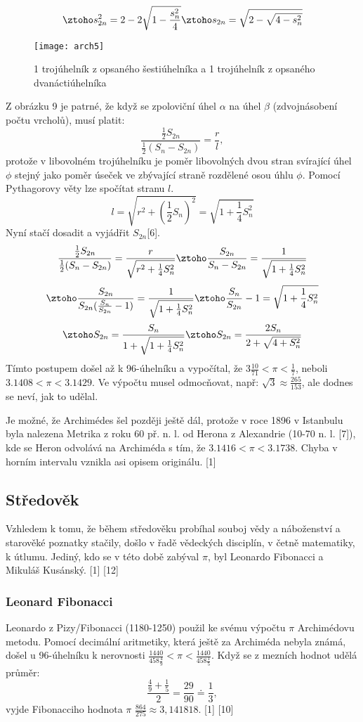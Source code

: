 \documentclass[soc]{gzwroc} %
\begin{document}
\begin{equation}
\ztoho s_{2n}^2=2-2\sqrt{1-\frac{s_n^2}{4}} \ztoho s_{2n}=\sqrt{2-\sqrt{4-s_n^2}}
\end{equation}
\begin{figure}[!ht]
\texttt{[image: arch5]}
\caption{1 trojúhelník z opsaného šestiúhelníka a 1 trojúhelník z opsaného dvanáctiúhelníka}
\label{fig:kruh}
\end{figure}
Z obrázku 9 je patrné, že když se zpoloviční úhel $\alpha$ na úhel $\beta$ (zdvojnásobení počtu vrcholů), musí platit:
$$
\frac{\frac{1}{2}S_{2n}}{\frac{1}{2}(S_n-S_{2n})}=\frac{r}{l},
$$
protože v libovolném trojúhelníku je poměr libovolných dvou stran svírající úhel $\phi$ stejný jako poměr úseček ve zbývající straně rozdělené osou úhlu $\phi$. Pomocí Pythagorovy věty lze spočítat stranu $l$.
$$
l=\sqrt{r^2+\left(\frac{1}{2}S_n\right)^2}=\sqrt{1+\frac{1}{4}S_n^2}
$$
Nyní stačí dosadit a vyjádřit $S_{2n}$[6].
$$
\frac{\frac{1}{2}S_{2n}}{\frac{1}{2}(S_n-S_{2n})}=\frac{r}{\sqrt{r^2+\frac{1}{4}S^2_n}} \ztoho \frac{S_{2n}}{S_n-S_{2n}}=\frac{1}{\sqrt{1+\frac{1}{4}S^2_n}}
$$
$$
\ztoho \frac{S_{2n}}{S_{2n}(\frac{S_n}{S_{2n}}-1)}=\frac{1}{\sqrt{1+\frac{1}{4}S^2_n}} \ztoho \frac{S_n}{S_{2n}}-1=\sqrt{1+\frac{1}{4}S^2_n}
$$
\begin{equation}
\ztoho S_{2n}=\frac{S_n}{1+\sqrt{1+\frac{1}{4}S^2_n}} \ztoho S_{2n}=\frac{2S_n}{2+\sqrt{4+S^2_n}} 
\end{equation}
Tímto postupem došel až k 96-úhelníku a vypočítal, že $3\frac{10}{71}<\pi <\frac{1}{7}$, neboli $3.1408<\pi <3.1429$. Ve výpočtu musel odmocňovat, např: $\sqrt{3}\approx \frac{265}{153}$, ale dodnes se neví, jak to udělal.

Je možné, že Archimédes šel později ještě dál, protože v roce 1896 v Istanbulu byla nalezena Metrika z roku 60 př. n. l. od Herona z Alexandrie (10-70 n. l. [7]), kde se Heron odvolává na Archiméda s tím, že $3.1416<\pi <3.1738$. Chyba v horním intervalu vznikla asi opisem originálu. [1]
\subsection{Středověk}
Vzhledem k tomu, že během středověku probíhal souboj vědy a náboženství a starověké poznatky stačily, došlo v řadě vědeckých disciplín, v četně matematiky, k útlumu. Jediný, kdo se v této době zabýval $\pi$, byl Leonardo Fibonacci a Mikuláš Kusánský. [1] [12]
\subsubsection{Leonard Fibonacci}
Leonardo z Pizy/Fibonacci (1180-1250) použil ke svému výpočtu $\pi$ Archimédovu metodu. Pomocí decimální aritmetiky, která ještě za Archiméda nebyla známá, došel u 96-úhelníku k nerovnosti $\frac{1440}{458\frac{4}{9}}<\pi<\frac{1440}{458\frac{1}{5}}$. Když se z mezních hodnot udělá průměr:
$$
\frac{\frac{4}{9}+\frac{1}{5}}{2}=\frac{29}{90}\doteq\frac{1}{3},
$$
vyjde Fibonacciho hodnota $\pi$ $\frac{864}{275}\approx 3,141818$. [1] [10]
\end{document}

